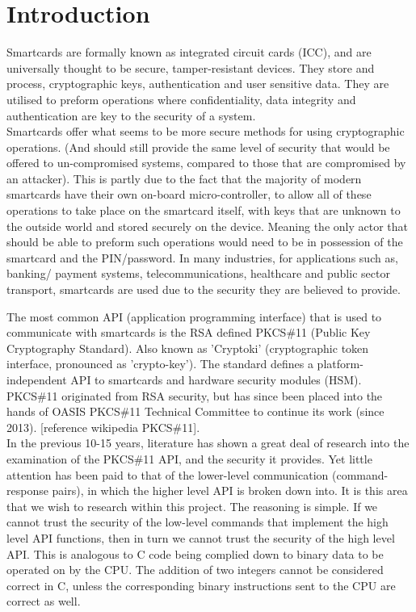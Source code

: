 \documentclass[bsc,frontabs,twoside,singlespacing,parskip,deptreport]{infthesis}     %
\begin{document}


\chapter{Introduction}
Smartcards are formally known as integrated circuit cards (ICC), and are universally thought to be secure, tamper-resistant devices. They store and process, cryptographic keys, authentication and user sensitive data. They are utilised to preform operations where confidentiality, data integrity and authentication are key to the security of a system.\\

Smartcards offer what seems to be more secure methods for using cryptographic operations. (And should still provide the same level of security that would be offered to un-compromised systems, compared to those that are compromised by an attacker). This is partly due to the fact that the majority of modern smartcards have their own on-board micro-controller, to allow all of these operations to take place on the smartcard itself, with keys that are unknown to the outside world and stored securely on the device. Meaning the only actor that should be able to preform such operations would need to be in possession of the smartcard and the PIN/password. In many industries, for applications such as, banking/ payment systems, telecommunications, healthcare and public sector transport, smartcards are used due to the security they are believed to provide.

The most common API (application programming interface) that is used to communicate with smartcards is the RSA defined PKCS\#11 (Public Key Cryptography Standard). Also known as 'Cryptoki' (cryptographic token interface, pronounced as 'crypto-key'). The standard defines a platform-independent API to smartcards and hardware security modules (HSM). PKCS\#11 originated from RSA security, but has since been placed into the hands of OASIS PKCS\#11 Technical Committee to continue its work (since 2013). [reference wikipedia PKCS\#11].\\


In the previous 10-15 years, literature has shown a great deal of research into the examination of the PKCS\#11 API, and the security it provides. Yet little attention has been paid to that of the lower-level communication (command-response pairs), in which the higher level API is broken down into. It is this area that we wish to research within this project. The reasoning is simple. If we cannot trust the security of the low-level commands that implement the high level API functions, then in turn we cannot trust the security of the high level API. This is analogous to C code being complied down to binary data to be operated on by the CPU. The addition of two integers cannot be considered correct in C, unless the corresponding binary instructions sent to the CPU are correct as well.  
\end{document}
